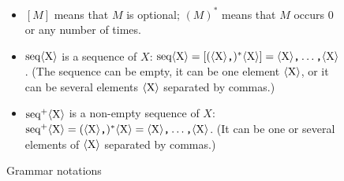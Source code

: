 \begin{figure}
\begin{itemize}

\item $[M]$ means that $M$ is optional; $(M)^*$ means that $M$ occurs 0 or
any number of times.

\item
$\textrm{seq}\langle\textrm{X}\rangle$ is a sequence of $X$: $\textrm{seq}\langle\textrm{X}\rangle = [(\langle\textrm{X}\rangle\texttt{,})^*\langle\textrm{X}\rangle] = \langle\textrm{X}\rangle\texttt{,}\ldots\texttt{,}\langle\textrm{X}\rangle$. (The sequence can be empty, it can be one element $\langle\textrm{X}\rangle$, or it can be several elements $\langle\textrm{X}\rangle$ separated by commas.)

\item
$\textrm{seq}^+\langle\textrm{X}\rangle$ is a non-empty sequence of $X$: $\textrm{seq}^+\langle\textrm{X}\rangle = (\langle\textrm{X}\rangle\texttt{,})^*\langle\textrm{X}\rangle = \langle\textrm{X}\rangle\texttt{,}\ldots\texttt{,}\langle\textrm{X}\rangle$.
(It can be one or several elements of $\langle\textrm{X}\rangle$ separated by commas.)

\end{itemize}
\caption{Grammar notations}
\label{fig:syntax0}
\end{figure}

